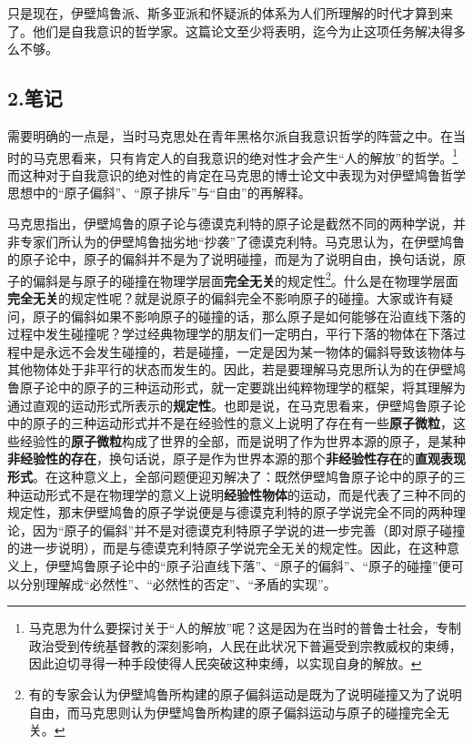 \documentclass[a4paper,twoside,12pt]{ctexart}
\begin{document}
只是现在，伊壁鸠鲁派、斯多亚派和怀疑派的体系为人们所理解的时代才算到来了。他们是自我意识的哲学家。这篇论文至少将表明，迄今为止这项任务解决得多么不够。

\newpage
\subsection{2.笔记}
需要明确的一点是，当时马克思处在青年黑格尔派自我意识哲学的阵营之中。在当时的马克思看来，只有肯定人的自我意识的绝对性才会产生“人的解放”的哲学。\footnote{马克思为什么要探讨关于“人的解放”呢？这是因为在当时的普鲁士社会，专制政治受到传统基督教的深刻影响，人民在此状况下普遍受到宗教威权的束缚，因此迫切寻得一种手段使得人民突破这种束缚，以实现自身的解放。}而这种对于自我意识的绝对性的肯定在马克思的博士论文中表现为对伊壁鸠鲁哲学思想中的“原子偏斜”、“原子排斥”与“自由”的再解释。

马克思指出，伊壁鸠鲁的原子论与德谟克利特的原子论是截然不同的两种学说，并非专家们所认为的伊壁鸠鲁拙劣地“抄袭”了德谟克利特。马克思认为，在伊壁鸠鲁的原子论中，原子的偏斜并不是为了说明碰撞，而是为了说明自由，换句话说，原子的偏斜是与原子的碰撞在物理学层面\textbf{完全无关}的规定性\footnote{有的专家会认为伊壁鸠鲁所构建的原子偏斜运动是既为了说明碰撞又为了说明自由，而马克思则认为伊壁鸠鲁所构建的原子偏斜运动与原子的碰撞完全无关。}。什么是在物理学层面\textbf{完全无关}的规定性呢？就是说原子的偏斜完全不影响原子的碰撞。大家或许有疑问，原子的偏斜如果不影响原子的碰撞的话，那么原子是如何能够在沿直线下落的过程中发生碰撞呢？学过经典物理学的朋友们一定明白，平行下落的物体在下落过程中是永远不会发生碰撞的，若是碰撞，一定是因为某一物体的偏斜导致该物体与其他物体处于非平行的状态而发生的。因此，若是要理解马克思所认为的在伊壁鸠鲁原子论中的原子的三种运动形式，就一定要跳出纯粹物理学的框架，将其理解为通过直观的运动形式所表示的\textbf{规定性}。也即是说，在马克思看来，伊壁鸠鲁原子论中的原子的三种运动形式并不是在经验性的意义上说明了存在有一些\textbf{原子微粒}，这些经验性的\textbf{原子微粒}构成了世界的全部，而是说明了作为世界本源的原子，是某种\textbf{非经验性的存在}，换句话说，原子是作为世界本源的那个\textbf{非经验性存在}的\textbf{直观表现形式}。在这种意义上，全部问题便迎刃解决了：既然伊壁鸠鲁原子论中的原子的三种运动形式不是在物理学的意义上说明\textbf{经验性物体}的运动，而是代表了三种不同的规定性，那末伊壁鸠鲁的原子学说便是与德谟克利特的原子学说完全不同的两种理论，因为“原子的偏斜”并不是对德谟克利特原子学说的进一步完善（即对原子碰撞的进一步说明），而是与德谟克利特原子学说完全无关的规定性。因此，在这种意义上，伊壁鸠鲁原子论中的“原子沿直线下落”、“原子的偏斜”、“原子的碰撞”便可以分别理解成“必然性”、“必然性的否定”、“矛盾的实现”。
\end{document}
